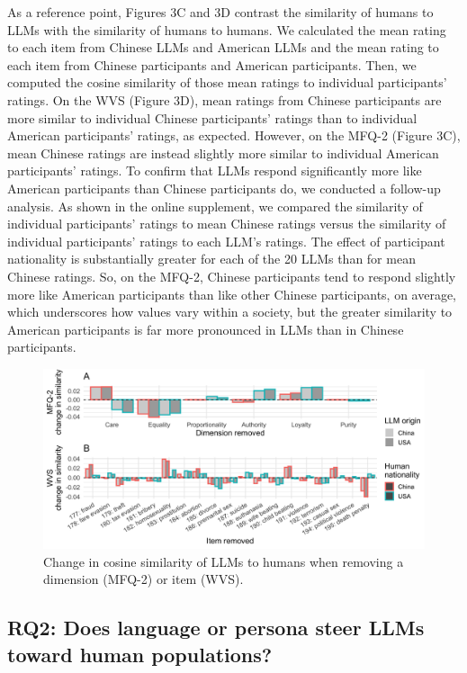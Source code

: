 \documentclass[11pt,a4paper]{article}
\begin{document}
\indent As a reference point, Figures 3C and 3D contrast the similarity of humans to LLMs with the similarity of humans to humans. We calculated the mean rating to each item from Chinese LLMs and American LLMs and the mean rating to each item from Chinese participants and American participants. Then, we computed the cosine similarity of those mean ratings to individual participants’ ratings. On the WVS (Figure 3D), mean ratings from Chinese participants are more similar to individual Chinese participants’ ratings than to individual American participants’ ratings, as expected. However, on the MFQ-2 (Figure 3C), mean Chinese ratings are instead slightly more similar to individual American participants’ ratings. To confirm that LLMs respond significantly more like American participants than Chinese participants do, we conducted a follow-up analysis. As shown in the online supplement, we compared the similarity of individual participants’ ratings to mean Chinese ratings versus the similarity of individual participants’ ratings to each LLM’s ratings. The effect of participant nationality is substantially greater for each of the 20 LLMs than for mean Chinese ratings. So, on the MFQ-2, Chinese participants tend to respond slightly more like American participants than like other Chinese participants, on average, which underscores how values vary within a society, but the greater similarity to American participants is far more pronounced in LLMs than in Chinese participants.

\begin{figure}
    \centering
    \includegraphics[width=1\linewidth]{fig5.png}
    \caption{Change in cosine similarity of LLMs to humans when removing a dimension (MFQ-2) or item (WVS).}
    \label{fig:placeholder}   
\end{figure}

\subsection{RQ2: Does language or persona steer LLMs toward human populations?}
\end{document}
